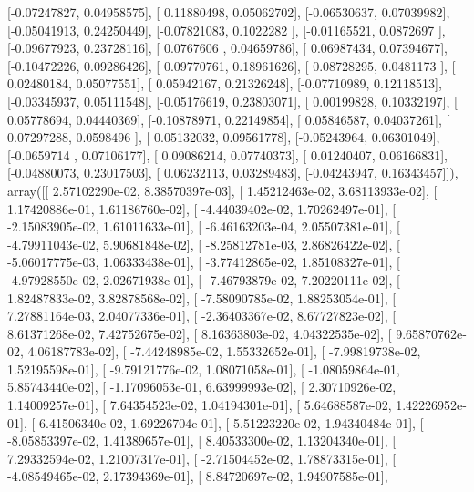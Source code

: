 \documentclass{article}
\begin{document}
       [-0.07247827,  0.04958575],
       [ 0.11880498,  0.05062702],
       [-0.06530637,  0.07039982],
       [-0.05041913,  0.24250449],
       [-0.07821083,  0.1022282 ],
       [-0.01165521,  0.0872697 ],
       [-0.09677923,  0.23728116],
       [ 0.0767606 ,  0.04659786],
       [ 0.06987434,  0.07394677],
       [-0.10472226,  0.09286426],
       [ 0.09770761,  0.18961626],
       [ 0.08728295,  0.0481173 ],
       [ 0.02480184,  0.05077551],
       [ 0.05942167,  0.21326248],
       [-0.07710989,  0.12118513],
       [-0.03345937,  0.05111548],
       [-0.05176619,  0.23803071],
       [ 0.00199828,  0.10332197],
       [ 0.05778694,  0.04440369],
       [-0.10878971,  0.22149854],
       [ 0.05846587,  0.04037261],
       [ 0.07297288,  0.0598496 ],
       [ 0.05132032,  0.09561778],
       [-0.05243964,  0.06301049],
       [-0.0659714 ,  0.07106177],
       [ 0.09086214,  0.07740373],
       [ 0.01240407,  0.06166831],
       [-0.04880073,  0.23017503],
       [ 0.06232113,  0.03289483],
       [-0.04243947,  0.16343457]]), array([[  2.57102290e-02,   8.38570397e-03],
       [  1.45212463e-02,   3.68113933e-02],
       [  1.17420886e-01,   1.61186760e-02],
       [ -4.44039402e-02,   1.70262497e-01],
       [ -2.15083905e-02,   1.61011633e-01],
       [ -6.46163203e-04,   2.05507381e-01],
       [ -4.79911043e-02,   5.90681848e-02],
       [ -8.25812781e-03,   2.86826422e-02],
       [ -5.06017775e-03,   1.06333438e-01],
       [ -3.77412865e-02,   1.85108327e-01],
       [ -4.97928550e-02,   2.02671938e-01],
       [ -7.46793879e-02,   7.20220111e-02],
       [  1.82487833e-02,   3.82878568e-02],
       [ -7.58090785e-02,   1.88253054e-01],
       [  7.27881164e-03,   2.04077336e-01],
       [ -2.36403367e-02,   8.67727823e-02],
       [  8.61371268e-02,   7.42752675e-02],
       [  8.16363803e-02,   4.04322535e-02],
       [  9.65870762e-02,   4.06187783e-02],
       [ -7.44248985e-02,   1.55332652e-01],
       [ -7.99819738e-02,   1.52195598e-01],
       [ -9.79121776e-02,   1.08071058e-01],
       [ -1.08059864e-01,   5.85743440e-02],
       [ -1.17096053e-01,   6.63999993e-02],
       [  2.30710926e-02,   1.14009257e-01],
       [  7.64354523e-02,   1.04194301e-01],
       [  5.64688587e-02,   1.42226952e-01],
       [  6.41506340e-02,   1.69226704e-01],
       [  5.51223220e-02,   1.94340484e-01],
       [ -8.05853397e-02,   1.41389657e-01],
       [  8.40533300e-02,   1.13204340e-01],
       [  7.29332594e-02,   1.21007317e-01],
       [ -2.71504452e-02,   1.78873315e-01],
       [ -4.08549465e-02,   2.17394369e-01],
       [  8.84720697e-02,   1.94907585e-01],
\end{document}

